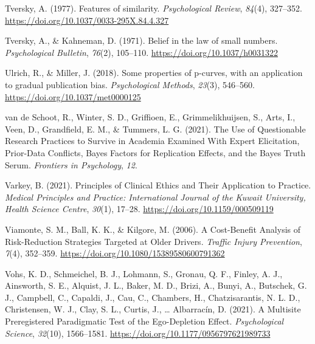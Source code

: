 \documentclass[
  letterpaper,
  DIV=11,
  numbers=noendperiod]{scrreprt}
\newlength{\cslhangindent}
\newlength{\cslentryspacingunit} %
\newenvironment{CSLReferences}[2] %
 {%
  \setlength{\parindent}{0pt}
  \ifodd #1
  \let\oldpar\par
  \def\par{\hangindent=\cslhangindent\oldpar}
  \fi
  \setlength{\parskip}{#2\cslentryspacingunit}
 }%
 {}
\begin{document}
\begin{CSLReferences}{1}{0}
\leavevmode{}%
Tversky, A. (1977). Features of similarity. \emph{Psychological Review},
\emph{84}(4), 327--352. \url{https://doi.org/10.1037/0033-295X.84.4.327}

\leavevmode{}%
Tversky, A., \& Kahneman, D. (1971). Belief in the law of small numbers.
\emph{Psychological Bulletin}, \emph{76}(2), 105--110.
\url{https://doi.org/10.1037/h0031322}

\leavevmode{}%
Ulrich, R., \& Miller, J. (2018). Some properties of p-curves, with an
application to gradual publication bias. \emph{Psychological Methods},
\emph{23}(3), 546--560. \url{https://doi.org/10.1037/met0000125}

\leavevmode{}%
van de Schoot, R., Winter, S. D., Griffioen, E., Grimmelikhuijsen, S.,
Arts, I., Veen, D., Grandfield, E. M., \& Tummers, L. G. (2021). The
{Use} of {Questionable Research Practices} to {Survive} in {Academia
Examined With Expert Elicitation}, {Prior-Data Conflicts}, {Bayes
Factors} for {Replication Effects}, and the {Bayes Truth Serum}.
\emph{Frontiers in Psychology}, \emph{12}.

\leavevmode{}%
Varkey, B. (2021). Principles of {Clinical Ethics} and {Their
Application} to {Practice}. \emph{Medical Principles and Practice:
International Journal of the Kuwait University, Health Science Centre},
\emph{30}(1), 17--28. \url{https://doi.org/10.1159/000509119}

\leavevmode{}%
Viamonte, S. M., Ball, K. K., \& Kilgore, M. (2006). A {Cost-Benefit
Analysis} of {Risk-Reduction Strategies Targeted} at {Older Drivers}.
\emph{Traffic Injury Prevention}, \emph{7}(4), 352--359.
\url{https://doi.org/10.1080/15389580600791362}

\leavevmode{}%
Vohs, K. D., Schmeichel, B. J., Lohmann, S., Gronau, Q. F., Finley, A.
J., Ainsworth, S. E., Alquist, J. L., Baker, M. D., Brizi, A., Bunyi,
A., Butschek, G. J., Campbell, C., Capaldi, J., Cau, C., Chambers, H.,
Chatzisarantis, N. L. D., Christensen, W. J., Clay, S. L., Curtis, J.,
\ldots{} Albarracín, D. (2021). A {Multisite Preregistered Paradigmatic
Test} of the {Ego-Depletion Effect}. \emph{Psychological Science},
\emph{32}(10), 1566--1581.
\url{https://doi.org/10.1177/0956797621989733}


\end{CSLReferences}
\end{document}
